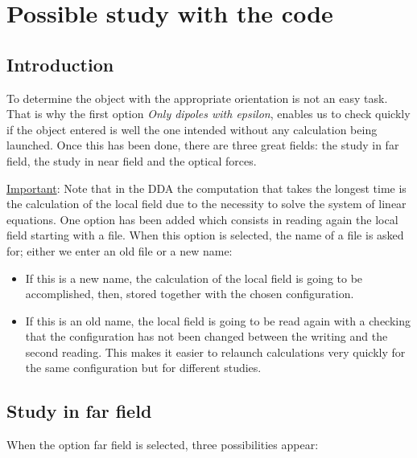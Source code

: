 \chapter{Possible study with the code}\label{chap5}

\minitoc

\section{Introduction}

To determine the object with the appropriate orientation is not an
easy task.  That is why the first option {\it Only dipoles with
  epsilon}, enables us to check quickly if the object entered is well
the one intended without any calculation being launched. Once this has
been done, there are three great fields: the study in far field, the
study in near field and the optical forces.

\vskip10mm

{\underline{Important}}: Note that in the DDA the computation that
takes the longest time is the calculation of the local field due to
the necessity to solve the system of linear equations.  One option has
been added which consists in reading again the local field starting
with a file. When this option is selected, the name of a file is asked
for; either we enter an old file or a new name:

\begin{itemize}
\item If this is a new name, the calculation of the local field is
  going to be accomplished, then, stored together with the chosen
  configuration.
\item If this is an old name, the local field is going to be read
  again with a checking that the configuration has not been changed
  between the writing and the second reading. This makes it easier to
  relaunch calculations very quickly for the same configuration but
  for different studies.
\end{itemize}

\section{Study in far field}

When the option far field is selected, three possibilities appear:

